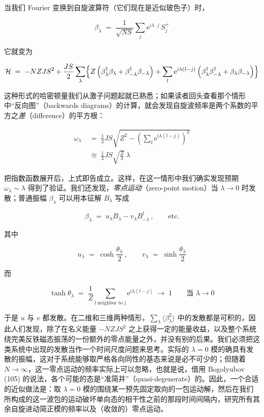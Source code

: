 当我们 Fourier 变换到自旋波算符（它们现在是近似玻色子）时，

\begin{equation*}
\beta_\lambda \;=\; \frac{1}{\sqrt{NS}}\sum_j \mathrm{e}^{i\lambda\cdot j}\, S_j^+
\end{equation*}

它就变为

\begin{equation*}
\mathcal{H} \;=\; -NZJS^2 + \frac{JS}{2}\sum_\lambda \Bigl\{ Z\left(\beta_\lambda^\dagger\beta_\lambda + \beta_{-\lambda}^\dagger\beta_{-\lambda}\right) + \sum_l \mathrm{e}^{i\lambda(l-j)}\left(\beta_\lambda^\dagger\beta_{-\lambda}^\dagger + \beta_\lambda\beta_{-\lambda}\right)\Bigr\}
\end{equation*}

这种形式的哈密顿量我们从激子问题起就已熟悉；如果读者回头查看那个情形中“反向图”（backwards diagrams）的计算，就会发现自旋波频率是两个系数的平方之\emph{差}（difference）的平方根：

\begin{align*}
\omega_\lambda \;&=\; \frac{1}{2}JS\sqrt{Z^2 - \left(\sum_l \mathrm{e}^{i\lambda(l-j)}\right)^2}\\
&\cong\; \frac{1}{2}JS\sqrt{\frac{Z}{3}}\ \lambda
\end{align*}

把指数函数展开后，上式即告成立。这样，在这一情形中我们确实发现预期 $\omega_\lambda\sim\lambda$ 得到了验证。我们还发现，\emph{零点运动}（zero-point motion）当 $\lambda\to 0$ 时发散；普通振幅 $\beta_\lambda$ 可以用本征解 $B_\lambda$ 写成

\begin{equation*}
\beta_\lambda \;=\; u_\lambda B_\lambda - v_\lambda B_{-\lambda}^\dagger\,,\qquad \text{etc.}
\end{equation*}

其中

\begin{equation*}
u_\lambda \;=\; \cosh\frac{\theta_\lambda}{2}\,,\qquad v_\lambda \;=\; \sinh\frac{\theta_\lambda}{2}
\end{equation*}

而

\begin{equation*}
\tanh\theta_\lambda \;=\; \frac{1}{Z}\sum_{\text{l neighbor to j}} \mathrm{e}^{i\lambda(l-j)} \;\to\; 1 \qquad\text{当 } \lambda\to 0
\end{equation*}

于是 $u$ 与 $v$ 都发散。在二维和三维两种情形，$\sum_\lambda\langle\beta_\lambda^2\rangle$ 中的发散都是可积的，因此人们发现，除了在名义能量 $-NZJS^2$ 之上获得一定的能量收益，以及整个系统绕完美反铁磁态振荡的一份额外的零点能量之外，并没有别的后果。我们必须把这类系统中出现的发散当作一个时间尺度问题来思考。实际的 $\lambda = 0$ 模的确具有发散的振幅，这对于系统能够取严格各向同性的基态来说是必不可少的；但随着 $N\to\infty$，这一零点运动的频率实际上可以忽略，也就是说，借用 Bogolyubov (105) 的说法，各个可能的态是“准简并”（quasi-degenerate）的。因此，一个合适的近似做法是：取 $\lambda = 0$ 模的围绕某一预先固定取向的一包运动解，然后在我们所构成的这一波包的运动破坏单向态的相干性之前的那段时间间隔内，研究所有其余自旋进动简正模的频率以及（收敛的）零点运动。

